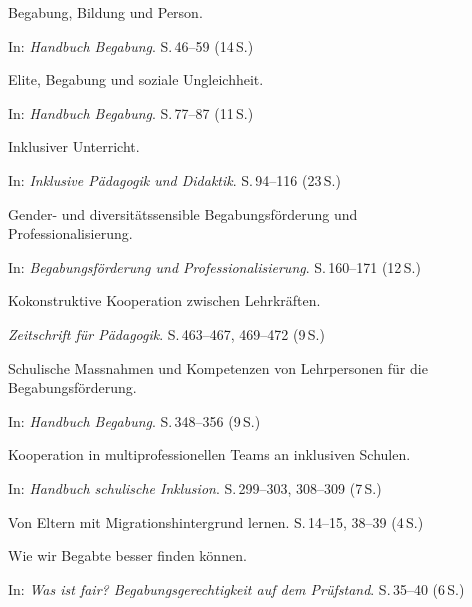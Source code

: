 \begin{description}
  \item[\cite{weigand2021person}] Begabung, Bildung und Person.
    
    In: \textit{Handbuch Begabung}.
    S.\,46--59 (14\,S.)

  \item[\cite{horvath2021elite}] Elite, Begabung und soziale Ungleichheit.
    
    In: \textit{Handbuch Begabung}.
    S.\,77--87 (11\,S.)

  \item[\cite{muellerboeschschaffnermenn2021udl}] Inklusiver Unterricht.
    
    In: \textit{Inklusive P\"adagogik und Didaktik}.
    S.\,94--116 (23\,S.)

  \item[\cite{macha2019gender}] Gender- und diversitätssensible Begabungsförderung und Professionalisierung.
    
    In: \textit{Begabungsförderung und Professionalisierung}.
    S.\,160--171 (12\,S.)

  \item[\cite{groschefussangelgraesel2020kokonstruktion}] Kokonstruktive Kooperation zwischen Lehrkräften.
    
    \textit{Zeitschrift f\"ur P\"adagogik}.
    S.\,463--467, 469--472 (9\,S.)

  \item[\cite{nguyensliwka2021massnahmen}] Schulische Massnahmen und Kompetenzen von Lehrpersonen für die Begabungsförderung.
    
    In: \textit{Handbuch Begabung}.
    S.\,348--356 (9\,S.)

  \item[\cite{widmerwolf2018multiprofessionell}] Kooperation in multiprofessionellen Teams an inklusiven Schulen.
    
    In: \textit{Handbuch schulische Inklusion}.
    S.\,299--303, 308--309 (7\,S.)

  \item[\cite{kosoroklabhart2021voneltern}] Von Eltern mit Migrationshintergrund lernen.
    S.\,14--15, 38--39 (4\,S.)

  \item[\cite{baudson2025besserfinden}] Wie wir Begabte besser finden können.
    
    In: \textit{Was ist fair? Begabungsgerechtigkeit auf dem Prüfstand}.
    S.\,35--40 (6\,S.)

\end{description}

